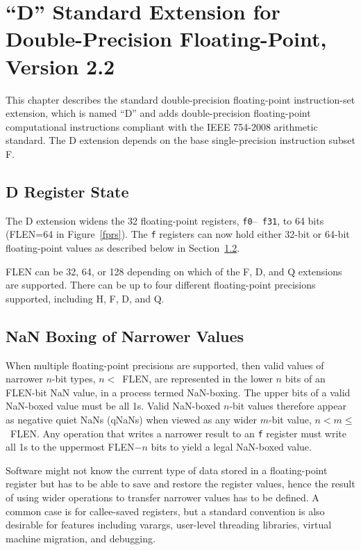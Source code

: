 \chapter{``D'' Standard Extension for Double-Precision Floating-Point,
Version 2.2}

This chapter describes the standard double-precision floating-point
instruction-set extension, which is named ``D'' and adds
double-precision floating-point computational instructions compliant
with the IEEE 754-2008 arithmetic standard.  The D extension depends on
the base single-precision instruction subset F.

\section{D Register State}

The D extension widens the 32 floating-point registers, {\tt f0}--{\tt
  f31}, to 64 bits (FLEN=64 in Figure~\ref{fprs}).  The {\tt f}
registers can now hold either 32-bit or 64-bit floating-point values
as described below in Section~\ref{nanboxing}.

\begin{commentary}
FLEN can be 32, 64, or 128 depending on which of the F, D, and Q
extensions are supported.  There can be up to four different
floating-point precisions supported, including H, F, D, and Q.
\end{commentary}

\section{NaN Boxing of Narrower Values}
\label{nanboxing}

When multiple floating-point precisions are supported, then valid
values of narrower $n$-bit types, \mbox{$n<$ FLEN}, are represented in
the lower $n$ bits of an FLEN-bit NaN value, in a process termed
NaN-boxing.  The upper bits of a valid NaN-boxed value must be all 1s.
Valid NaN-boxed $n$-bit values therefore appear as negative quiet NaNs
(qNaNs) when viewed as any wider $m$-bit value, \mbox{$n < m \leq$
  FLEN}.  Any operation that writes a narrower result to an {\tt f}
register must write all 1s to the uppermost FLEN$-n$ bits to yield a
legal NaN-boxed value.

\begin{commentary}
Software might not know the current type of data stored in a
floating-point register but has to be able to save and restore the
register values, hence the result of using wider operations to
transfer narrower values has to be defined.  A common case is for
callee-saved registers, but a standard convention is also desirable for
features including varargs, user-level threading libraries, virtual
machine migration, and debugging.
\end{commentary}

